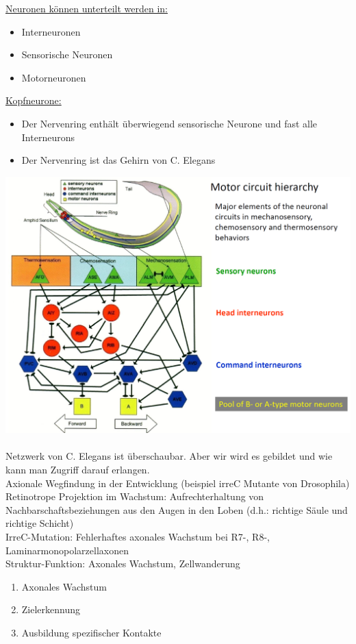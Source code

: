 \documentclass[12pt,a4paper]{article}
\begin{document}
\underline{Neuronen können unterteilt werden in:}
\begin{itemize}
	\item Interneuronen
	\item Sensorische Neuronen
	\item Motorneuronen
\end{itemize}

\underline{Kopfneurone:}
\begin{itemize}
	\item Der Nervenring enthält überwiegend sensorische Neurone und fast alle Interneurons
	\item Der Nervenring ist das Gehirn von C. Elegans
\end{itemize}

\includegraphics[width=1\textwidth]{lectures/160511/pix/c_elegans_neurones.png}
\\\\
Netzwerk von C. Elegans ist überschaubar. Aber wir wird es gebildet und wie kann man Zugriff darauf erlangen.\\

Axionale Wegfindung in der Entwicklung (beispiel irreC Mutante von Drosophila)
Retinotrope Projektion im Wachstum: Aufrechterhaltung von Nachbarschaftsbeziehungen aus den Augen in den Loben (d.h.: richtige Säule und richtige Schicht)\\

IrreC-Mutation: Fehlerhaftes axonales Wachstum bei R7-, R8-, Laminarmonopolarzellaxonen\\

Struktur-Funktion: Axonales Wachstum, Zellwanderung
\begin{enumerate}
	\item Axonales Wachstum
	\item Zielerkennung
	\item Ausbildung spezifischer Kontakte
\end{enumerate}
\end{document}

